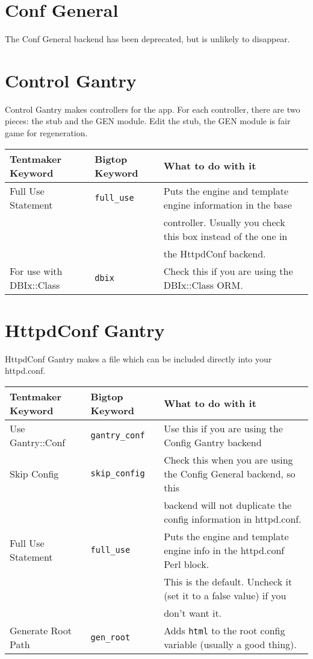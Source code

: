 \section{Conf General}

The Conf General backend has been deprecated, but is unlikely to disappear.

\section{Control Gantry}

Control Gantry makes controllers for the app.  For each controller, there
are two pieces: the stub and the GEN module.  Edit the stub, the GEN
module is fair game for regeneration.

\begin{tabular}{l|l|l}
Tentmaker Keyword & Bigtop Keyword & What to do with it \\
\hline
Full Use Statement & \verb+full_use+ &
    Puts the engine and template engine information in the base \\
& & controller.  Usually you check this box instead of the one in \\
& & the HttpdConf backend. \\

For use with DBIx::Class & \verb+dbix+ &
    Check this if you are using the DBIx::Class ORM. \\
\end{tabular}

\section{HttpdConf Gantry}

HttpdConf Gantry makes a file which can be included directly into
your httpd.conf.

\begin{tabular}{l|l|l}
Tentmaker Keyword & Bigtop Keyword & What to do with it \\
\hline
Use Gantry::Conf  & \verb+gantry_conf+  &
    Use this if you are using the Config Gantry backend \\

Skip Config        & \verb+skip_config+ &
    Check this when you are using the Config General backend, so this \\
& & backend will not duplicate the config information in httpd.conf.  \\

Full Use Statement & \verb+full_use+    &
    Puts the engine and template engine info in the httpd.conf Perl block. \\
& & This is the default.  Uncheck it (set it to a false value) if you \\
& & don't want it. \\

Generate Root Path & \verb+gen_root+ &
    Adds \verb+html+ to the root config variable (usually a good thing). \\    

\end{tabular}

